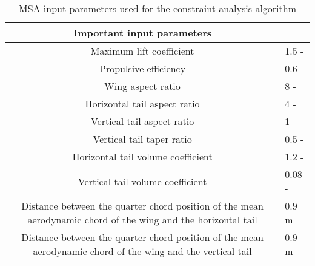 \begin{table}[H]
\centering

    \begin{tabular}{@{}Cl@{}}
    \toprule
    Important input parameters                                                                                    &        \\ \midrule
    Maximum lift coefficient                                                                                      & 1.5 -  \\
    Propulsive efficiency                                                                                         & 0.6 -  \\
    Wing aspect ratio                                                                                             & 8 -  \\
    Horizontal tail aspect ratio                                                                                  & 4 -  \\
    Vertical tail aspect ratio                                                                                    & 1 -    \\
    Vertical tail taper ratio                                                                                     & 0.5 -  \\
    Horizontal tail volume coefficient                                                                            & 1.2 -  \\
    Vertical tail volume coefficient                                                                              & 0.08 - \\
    Distance between the quarter chord position of the mean aerodynamic chord of the wing and the horizontal tail & 0.9 m  \\
    Distance between the quarter chord position of the mean aerodynamic chord of the wing and the vertical tail   & 0.9 m  \\ \bottomrule
    \end{tabular}
\caption{MSA input parameters used for the constraint analysis algorithm}
\label{tab: msa_input}
\end{table}